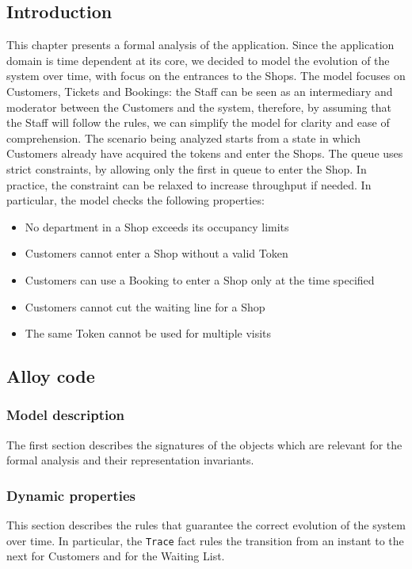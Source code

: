 \subsection{Introduction}
This chapter presents a formal analysis of the application. Since the application domain is time dependent at its core, we decided to model the evolution of the system over time, with focus on the entrances to the Shops. The model focuses on Customers, Tickets and Bookings: the Staff can be seen as an intermediary and moderator between the Customers and the system, therefore, by assuming that the Staff will follow the rules, we can simplify the model for clarity and ease of comprehension.
The scenario being analyzed starts from a state in which Customers already have acquired the tokens and enter the Shops. The queue uses strict constraints, by allowing only the first in queue to enter the Shop. In practice, the constraint can be relaxed to increase throughput if needed. 
In particular, the model checks the following properties:
\begin{itemize}
    \item No department in a Shop exceeds its occupancy limits
    \item Customers cannot enter a Shop without a valid Token
    \item Customers can use a Booking to enter a Shop only at the time specified
    \item Customers cannot cut the waiting line for a Shop
    \item The same Token cannot be used for multiple visits
\end{itemize}
\subsection{Alloy code}
\subsubsection{Model description}
The first section describes the signatures of the objects which are relevant for the formal analysis and their representation invariants.

\subsubsection{Dynamic properties}
This section describes the rules that guarantee the correct evolution of the system over time. In particular, the \texttt{Trace} fact rules the transition from an instant to the next for Customers and for the Waiting List. 

